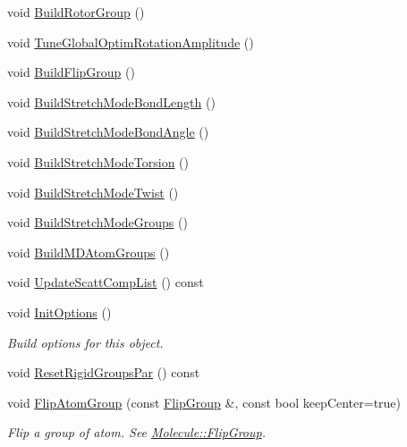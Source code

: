 \begin{DoxyCompactItemize}
\item 
void \mbox{\hyperlink{class_obj_cryst_1_1_molecule_a3642fa8104faa1ce84a977600f9d1aeb}{Build\+Rotor\+Group}} ()
\item 
void \mbox{\hyperlink{class_obj_cryst_1_1_molecule_a9cc198b9cb896d28c7bd90a775db4ec2}{Tune\+Global\+Optim\+Rotation\+Amplitude}} ()
\item 
void \mbox{\hyperlink{class_obj_cryst_1_1_molecule_aca2ed46d26209807d587722d131c6315}{Build\+Flip\+Group}} ()
\item 
void \mbox{\hyperlink{class_obj_cryst_1_1_molecule_abb51819a0eae8b612fb4007ffa16d2b7}{Build\+Stretch\+Mode\+Bond\+Length}} ()
\item 
void \mbox{\hyperlink{class_obj_cryst_1_1_molecule_a3d507a4e25612a7412cbcc84b5a831ae}{Build\+Stretch\+Mode\+Bond\+Angle}} ()
\item 
void \mbox{\hyperlink{class_obj_cryst_1_1_molecule_a18d44782b4141dfab334250967d202ad}{Build\+Stretch\+Mode\+Torsion}} ()
\item 
void \mbox{\hyperlink{class_obj_cryst_1_1_molecule_a7f4c6bf6e5be59780cb7844e53711fb3}{Build\+Stretch\+Mode\+Twist}} ()
\item 
void \mbox{\hyperlink{class_obj_cryst_1_1_molecule_a83b7b9bac2ce9fe7b310b5267232b1ca}{Build\+Stretch\+Mode\+Groups}} ()
\item 
void \mbox{\hyperlink{class_obj_cryst_1_1_molecule_a0944a68727d85bee4ec0cce453cb451c}{Build\+M\+D\+Atom\+Groups}} ()
\item 
void \mbox{\hyperlink{class_obj_cryst_1_1_molecule_a53e8b1249d2f489fd71f06612cde0bd4}{Update\+Scatt\+Comp\+List}} () const
\item 
\mbox{\label{class_obj_cryst_1_1_molecule_a15f72c789ad6e4cdae3a667d3d81e7eb}} 
void \mbox{\hyperlink{class_obj_cryst_1_1_molecule_a15f72c789ad6e4cdae3a667d3d81e7eb}{Init\+Options}} ()
\begin{DoxyCompactList}\small\item\em Build options for this object. \end{DoxyCompactList}\item 
void \mbox{\hyperlink{class_obj_cryst_1_1_molecule_aacd7668d81ffb43a889d6da6e07cde9b}{Reset\+Rigid\+Groups\+Par}} () const
\item 
\mbox{\label{class_obj_cryst_1_1_molecule_a4c6c144526c55f1497156b369a4362b5}} 
void \mbox{\hyperlink{class_obj_cryst_1_1_molecule_a4c6c144526c55f1497156b369a4362b5}{Flip\+Atom\+Group}} (const \mbox{\hyperlink{struct_obj_cryst_1_1_molecule_1_1_flip_group}{Flip\+Group}} \&, const bool keep\+Center=true)
\begin{DoxyCompactList}\small\item\em Flip a group of atom. See \mbox{\hyperlink{struct_obj_cryst_1_1_molecule_1_1_flip_group}{Molecule\+::\+Flip\+Group}}. \end{DoxyCompactList}\end{DoxyCompactItemize}
